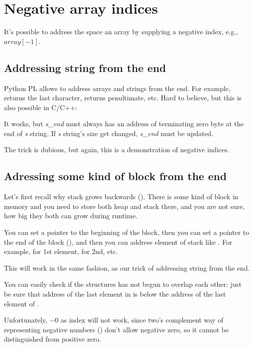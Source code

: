 \chapter{Negative array indices}
\label{negative_array_indices}

It's possible to address the space  an array by supplying a negative index, e.g., $array[-1]$.

\section{Addressing string from the end}

Python \ac{PL} allows to address arrays and strings from the end.
For example,  returns the last character,  returns penultimate, etc.
Hard to believe, but this is also possible in C/C++:



It works, but \textit{s\_end} must always has an address of terminating zero byte at the end of \textit{s} string.
If \textit{s} string's size get changed, \textit{s\_end} must be updated.

The trick is dubious, but again, this is a demonstration of negative indices.

\section{Adressing some kind of block from the end}

Let's first recall why stack grows backwards ().
There is some kind of block in memory and you need to store both heap and stack there, and you are not sure,
how big they both can grow during runtime.

You can set a  pointer to the beginning of the block,
then you can set a  pointer to the end of the block (),
and then you can address  element of stack like .
For example,  for 1st element,  for 2nd, etc.

This will work in the same fashion, as our trick of addressing string from the end.

You can easily check if the structures has not begun to overlap each other:
just be sure that address of the last element in  is below the address of the last element of .

Unfortunately, $-0$ as index will not work,
since two's complement way of representing negative numbers () don't allow negative zero,
so it cannot be distinguished from positive zero.

